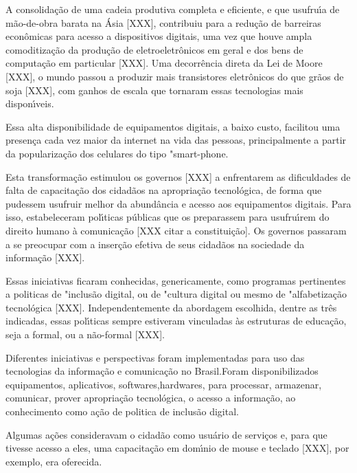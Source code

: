 \documentclass[
12pt,		%
openright,	%
twoside,  %
a4paper,			%
chapter=TITLE,		%
english,			%
french,				%
spanish,			%
brazil				%
]{USPSC-classe/USPSC}
\begin{document}
A consolida\c{c}\~ao de uma cadeia produtiva completa e eficiente, e que usufru\'{\i}a de m\~ao-de-obra barata na \'Asia [XXX], contribuiu para a redu\c{c}\~ao de barreiras econ\^omicas para acesso a dispositivos digitais, uma vez que houve ampla comoditiza\c{c}\~ao da produ\c{c}\~ao de eletroeletr\^onicos em geral e dos bens de computa\c{c}\~ao em particular [XXX]. Uma decorr\^encia direta da Lei de Moore [XXX], o mundo passou a produzir mais transistores eletr\^onicos do que gr\~aos de soja [XXX], com ganhos de escala que tornaram essas tecnologias mais dispon\'{\i}veis.




Essa alta disponibilidade de equipamentos digitais, a baixo custo, facilitou uma presen\c{c}a cada vez maior da internet na vida das pessoas, principalmente a partir da populariza\c{c}\~ao dos celulares do tipo "smart-phone.




Esta transforma\c{c}\~ao estimulou os governos [XXX] a enfrentarem as dificuldades  de falta de  capacita\c{c}\~ao dos cidad\~aos na apropria\c{c}\~ao tecnol\'ogica, de forma que pudessem usufruir melhor da abund\^ancia e acesso aos equipamentos digitais. Para isso, estabeleceram pol\'{\i}ticas p\'ublicas que os preparassem para usufru\'{\i}rem do direito humano \`a comunica\c{c}\~ao [XXX citar a constitui\c{c}\~ao]. Os governos passaram a se preocupar com a inser\c{c}\~ao efetiva de seus cidad\~aos na sociedade da informa\c{c}\~ao [XXX].




Essas iniciativas ficaram conhecidas, genericamente, como programas pertinentes a politicas de "inclus\~ao digital, ou  de "cultura digital ou mesmo de "alfabetiza\c{c}\~ao tecnol\'ogica [XXX]. Independentemente da abordagem escolhida, dentre as tr\^es indicadas, essas pol\'{\i}ticas sempre estiveram vinculadas \`as estruturas de educa\c{c}\~ao, seja a formal, ou a n\~ao-formal [XXX].




Diferentes iniciativas e perspectivas foram implementadas para uso das tecnologias da informa\c{c}\~ao e comunica\c{c}\~ao no Brasil.Foram disponibilizados equipamentos, aplicativos, softwares,hardwares, para processar, armazenar, comunicar, prover apropria\c{c}\~ao tecnol\'ogica, o acesso a  informa\c{c}\~ao, ao conhecimento como a\c{c}\~ao de politica de inclus\~ao digital.




Algumas a\c{c}\~oes consideravam o cidad\~ao como usu\'ario de servi\c{c}os e, para que tivesse acesso a eles, uma capacita\c{c}\~ao em dom\'{\i}nio de mouse e teclado [XXX], por exemplo, era oferecida.
\end{document}
